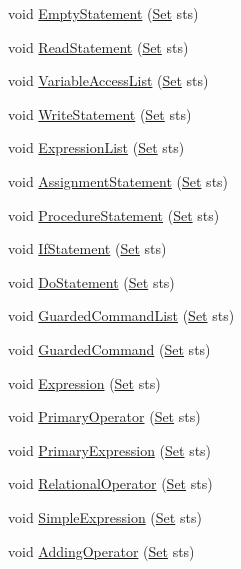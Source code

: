 \begin{DoxyCompactItemize}
\item 
void \hyperlink{classParser_aa5c2ec1d4c045a6783887bd7453e99ed}{EmptyStatement} (\hyperlink{classSet}{Set} sts)
\item 
void \hyperlink{classParser_ac356b40bf99f68cc721b7e4ad2ebb67d}{ReadStatement} (\hyperlink{classSet}{Set} sts)
\item 
void \hyperlink{classParser_a8b1f76ff69c6cd8e54c0d06405e26f38}{VariableAccessList} (\hyperlink{classSet}{Set} sts)
\item 
void \hyperlink{classParser_a092a51a38e65c3be07328bfc1e370f0e}{WriteStatement} (\hyperlink{classSet}{Set} sts)
\item 
void \hyperlink{classParser_a867bebdf8a97af4991fe044b9d7e616b}{ExpressionList} (\hyperlink{classSet}{Set} sts)
\item 
void \hyperlink{classParser_a472a0dc9ed06ffc3ec260992ae7197ca}{AssignmentStatement} (\hyperlink{classSet}{Set} sts)
\item 
void \hyperlink{classParser_a7a6c6b63d49340ff06c453ce8954eeff}{ProcedureStatement} (\hyperlink{classSet}{Set} sts)
\item 
void \hyperlink{classParser_af7ef9a71f5e821040a16974c4602e23e}{IfStatement} (\hyperlink{classSet}{Set} sts)
\item 
void \hyperlink{classParser_ae1ced275b4dafa58b751c66333a41f98}{DoStatement} (\hyperlink{classSet}{Set} sts)
\item 
void \hyperlink{classParser_a00618d906669f1d0908961dc6c6c51e0}{GuardedCommandList} (\hyperlink{classSet}{Set} sts)
\item 
void \hyperlink{classParser_ab9dbadf49595360da28b8cc77ddec8e7}{GuardedCommand} (\hyperlink{classSet}{Set} sts)
\item 
void \hyperlink{classParser_a155ac163cd68b4e1b8098b43be1189e1}{Expression} (\hyperlink{classSet}{Set} sts)
\item 
void \hyperlink{classParser_a7ac200c2e0ac927e115027fb593ac72d}{PrimaryOperator} (\hyperlink{classSet}{Set} sts)
\item 
void \hyperlink{classParser_abe6f497eafd870c3e9f28d4c241e280a}{PrimaryExpression} (\hyperlink{classSet}{Set} sts)
\item 
void \hyperlink{classParser_ab68b61bab0a323b67457d520578cb853}{RelationalOperator} (\hyperlink{classSet}{Set} sts)
\item 
void \hyperlink{classParser_a6fc78d62a16df562e2a22e0f5c1acaf9}{SimpleExpression} (\hyperlink{classSet}{Set} sts)
\item 
void \hyperlink{classParser_a909c968479dd3bafe797f2409e197179}{AddingOperator} (\hyperlink{classSet}{Set} sts)

\end{DoxyCompactItemize}
